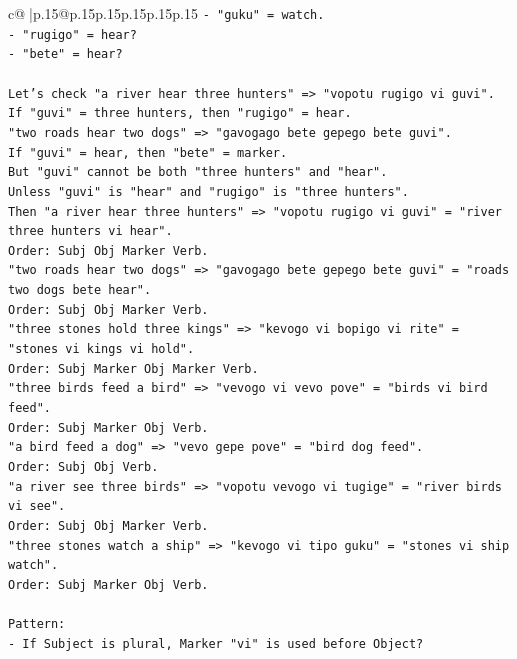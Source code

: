 \documentclass{article}
\begin{document}
{\begin{supertabular}{c@{$\;$}|p{.15\linewidth}@{}p{.15\linewidth}p{.15\linewidth}p{.15\linewidth}p{.15\linewidth}p{.15\linewidth}}
{{{\texttt{{-} "guku" = watch.} \\
\texttt{{-} "rugigo" = hear?} \\
\texttt{{-} "bete" = hear?} \\
\\ 
\texttt{Let's check "a river hear three hunters" => "vopotu rugigo vi guvi".} \\
\texttt{If "guvi" = three hunters, then "rugigo" = hear.} \\
\texttt{"two roads hear two dogs" => "gavogago bete gepego bete guvi".} \\
\texttt{If "guvi" = hear, then "bete" = marker.} \\
\texttt{But "guvi" cannot be both "three hunters" and "hear".} \\
\texttt{Unless "guvi" is "hear" and "rugigo" is "three hunters".} \\
\texttt{Then "a river hear three hunters" => "vopotu rugigo vi guvi" = "river three hunters vi hear".} \\
\texttt{Order: Subj Obj Marker Verb.} \\
\texttt{"two roads hear two dogs" => "gavogago bete gepego bete guvi" = "roads two dogs bete hear".} \\
\texttt{Order: Subj Obj Marker Verb.} \\
\texttt{"three stones hold three kings" => "kevogo vi bopigo vi rite" = "stones vi kings vi hold".} \\
\texttt{Order: Subj Marker Obj Marker Verb.} \\
\texttt{"three birds feed a bird" => "vevogo vi vevo pove" = "birds vi bird feed".} \\
\texttt{Order: Subj Marker Obj Verb.} \\
\texttt{"a bird feed a dog" => "vevo gepe pove" = "bird dog feed".} \\
\texttt{Order: Subj Obj Verb.} \\
\texttt{"a river see three birds" => "vopotu vevogo vi tugige" = "river birds vi see".} \\
\texttt{Order: Subj Obj Marker Verb.} \\
\texttt{"three stones watch a ship" => "kevogo vi tipo guku" = "stones vi ship watch".} \\
\texttt{Order: Subj Marker Obj Verb.} \\
\\ 
\texttt{Pattern:} \\
\texttt{{-} If Subject is plural, Marker "vi" is used before Object?} \\
}}}
\end{supertabular}}
\end{document}
